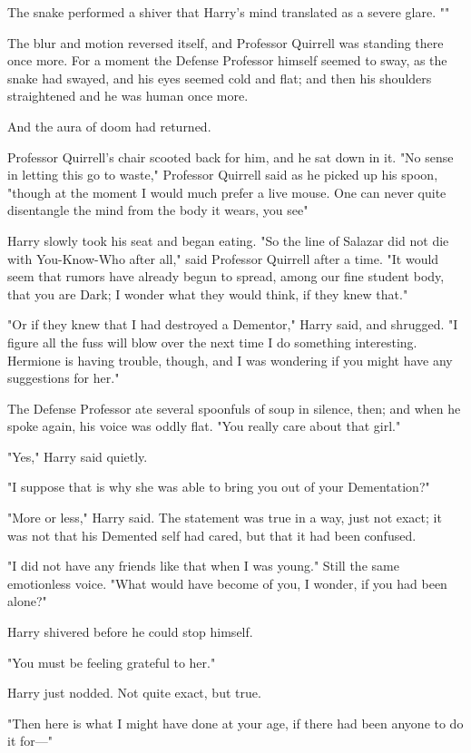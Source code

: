 The snake performed a shiver that Harry's mind translated as a severe glare.
""

The blur and motion reversed itself, and Professor Quirrell was standing there
once more. For a moment the Defense Professor himself seemed to sway, as the
snake had swayed, and his eyes seemed cold and flat; and then his shoulders
straightened and he was human once more.

And the aura of doom had returned.

Professor Quirrell's chair scooted back for him, and he sat down in it. "No
sense in letting this go to waste," Professor Quirrell said as he picked up his
spoon, "though at the moment I would much prefer a live mouse. One can never
quite disentangle the mind from the body it wears, you see{\el}"

Harry slowly took his seat and began eating.
\sbreak
"So the line of Salazar did not die with You-Know-Who after all," said
Professor Quirrell after a time. "It would seem that rumors have already begun
to spread, among our fine student body, that you are Dark; I wonder what they
would think, if they knew that."

"Or if they knew that I had destroyed a Dementor," Harry said, and shrugged. "I
figure all the fuss will blow over the next time I do something
interesting. Hermione is having trouble, though, and I was wondering if you
might have any suggestions for her."

The Defense Professor ate several spoonfuls of soup in silence, then; and when
he spoke again, his voice was oddly flat. "You really care about that girl."

"Yes," Harry said quietly.

"I suppose that is why she was able to bring you out of your Dementation?"

"More or less," Harry said. The statement was true in a way, just not exact; it
was not that his Demented self had cared, but that it had been confused.

"I did not have any friends like that when I was young." Still the same
emotionless voice. "What would have become of you, I wonder, if you had been
alone?"

Harry shivered before he could stop himself.

"You must be feeling grateful to her."

Harry just nodded. Not quite exact, but true.

"Then here is what I might have done at your age, if there had been anyone to
do it for—"
